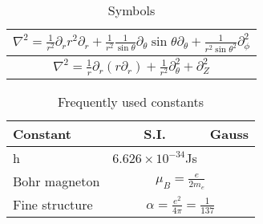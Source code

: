 \begin{table}
    \caption{Symbols}
    \label{tab:symbols}
    \begin{tabular}{c}
    \hline
    $\nabla^2 = \frac{1}{r^2}\partial_r r^2 \partial_r +
    \frac{1}{r^2}\frac{1}{\sin\theta} \partial_{\theta}\sin\theta\partial_{\theta} +
    \frac{1}{r^2\sin\theta^2}\partial^2_{\phi}$	\\
    \hline
    $\nabla^2 = \frac{1}{r}\partial_r (r\partial_r) +
    \frac{1}{r^2}\partial^2_{\theta} + \partial^2_Z$ \\
    \hline
    \end{tabular}
\end{table}
\begin{table}
    \caption{Frequently used constants}
    \label{tab:constants}
    \begin{center}
	\begin{tabular}{l|cc}
	    \hline
	    Constant    & S.I.  & Gauss \\
	    \hline
	    h	& $6.626\times10^{-34}$Js	&   \\
	    \hline
	    Bohr magneton   & \multicolumn{2}{c}{$\mu_B=\frac{e}{2m_e}$} \\
	    Fine structure  & \multicolumn{2}{c}{$\alpha=\frac{e^2}{4\pi}=\frac{1}{137}$}	\\
	    \hline
	\end{tabular}
    \end{center}
\end{table}
